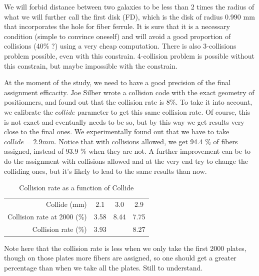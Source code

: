 \documentclass{extarticle}
\begin{document}
We will forbid distance between two galaxies to be less than 2 times the radius of what we will further call the first disk (FD), which is the disk of radius 0.990 mm that incorporates the hole for fiber ferrule. 
It is sure that it is a necessary condition (simple to convince oneself) and will avoid a good proportion of collisions (40\% ?) using a very cheap computation.
There is also 3-collisions problem possible, even with this constrain.
4-collision problem is possible without this constrain, but maybe impossible with the constrain.


At the moment of the study, we need to have a good precision of the final assignment efficacity. Joe Silber wrote a collision code with the exact geometry of positionners, and found out that the collision rate is 8\%. To take it into account, we calibrate the $collide$ parameter to get this same collision rate. Of course, this is not exact and eventually needs to be so, but by this way we get results very close to the final ones. We experimentally found out that we have to take $collide = 2.9 mm$.
Notice that with collisions allowed, we get 94.4 \% of fibers assigned, instead of 93.9 \% when they are not. A further improvement can be to do the assignment with collisions allowed and at the very end try to change the colliding ones, but it's likely to lead to the same results than now.


\begin{table}[H]\centering
	\begin{tabular}{r|ccc}
		Collide (mm) & 2.1 & 3.0 & 2.9\\ 
		Collision rate at 2000 (\%) & 3.58&8.44 & 7.75\\
		Collision rate (\%) & 3.93 & ~ & 8.27\\
	\end{tabular}
	\caption{Collision rate as a function of Collide}\label{colrate}
\end{table}

Note here that the collision rate is less when we only take the first 2000 plates, though on those plates more fibers are assigned, so one should get a greater percentage than when we take all the plates. Still to understand.
\end{document}
